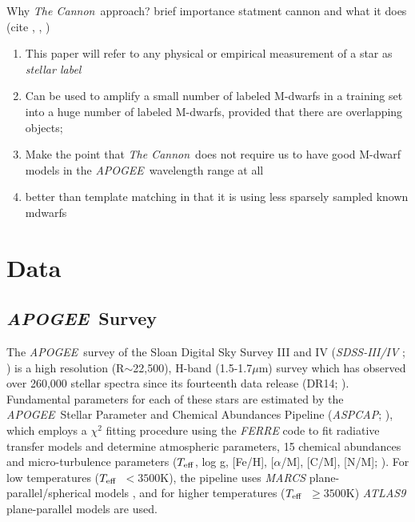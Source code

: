 \documentclass[modern]{aastex62}
\newcommand{\apogee}{\textsl{APOGEE}}
\newcommand{\thecannon}{\textsl{The Cannon}}
\newcommand{\aspcap}{\textsl{ASPCAP}}
\newcommand{\teff}{$T_{\rm eff}$}
\begin{document}
Why \thecannon\ approach? brief importance statment cannon and what it does (cite \citealt{Ness:2015}, \citealt{Ho:2017a}, \citealt{Casey:2016}) 

\begin{enumerate}
\item This paper will refer to any physical or empirical measurement of a star as \emph{stellar label}

\item Can be used to amplify a small number of labeled M-dwarfs in a training set into a huge number of labeled M-dwarfs, provided that there are overlapping objects; 

\item Make the point that \thecannon\ does not require us to have good M-dwarf models in the \apogee\ wavelength range at all 

\item better than template matching in that it is using less sparsely sampled known mdwarfs
\end{enumerate}



\section{Data} \label{sec:data}

\subsection{\apogee\ Survey}


The \apogee\ survey \citep{Majewski:2015} of the Sloan Digital Sky Survey III and IV (\textsl{SDSS-III/IV} \citealt{Eisenstein:2011}; \citealt{Blanton:2017}) is a high resolution (R$\sim$22,500), H-band (1.5-1.7$\mu$m) survey which has observed over 260,000 stellar spectra since its fourteenth data release (DR14; \citealt{Abolfathi:2017}). Fundamental parameters for each of these stars are estimated by the \apogee\ Stellar Parameter and Chemical Abundances Pipeline (\aspcap; \citealt{Perez:2016}), which employs a $\chi^2$ fitting procedure using the \textsl{FERRE} code to fit radiative transfer models and determine atmospheric parameters, 15 chemical abundances and micro-turbulence parameters (\teff, log g, [Fe/H], [$\alpha$/M], [C/M], [N/M]; \citealt{Meszaros:2012}). For low temperatures (\teff\ $<3500$K), the pipeline uses \textsl{MARCS} plane-parallel/spherical models \citep{Gustafsson:2008}, and for higher temperatures (\teff\ $\geq3500$K) \textsl{ATLAS9} \citep{Castelli:2004} plane-parallel models are used.
\end{document}
